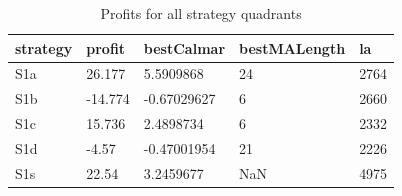 \documentclass{tewiart}
\begin{document}
\begin{table}[!t]
\caption{Profits for all strategy quadrants} 
 \begin{center} 
 \begin{tabular}{|l|l|l|l|l|} 
 \hline \textbf{strategy} & \textbf{profit} & \textbf{bestCalmar} & \textbf{bestMALength} & \textbf{la} \\ \hline  
S1a & 26.177 & 5.5909868 & 24 & 2764\\ \hline 
S1b & -14.774 & -0.67029627 & 6 & 2660\\ \hline 
S1c & 15.736 & 2.4898734 & 6 & 2332\\ \hline 
S1d & -4.57 & -0.47001954 & 21 & 2226\\ \hline 
S1s & 22.54 & 3.2459677 & NaN & 4975\\ 
\hline \end{tabular} 
 \end{center} 
 \end{table}
\FloatBarrier
\end{document}
